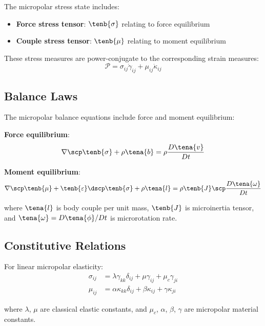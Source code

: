 The micropolar stress state includes:
\begin{itemize}
\item \textbf{Force stress tensor}: $\tenb{\sigma}$ relating to force equilibrium
\item \textbf{Couple stress tensor}: $\tenb{\mu}$ relating to moment equilibrium
\end{itemize}

These stress measures are power-conjugate to the corresponding strain measures:
\begin{equation}
\mathcal{P} = \sigma_{ij} \dot{\gamma}_{ij} + \mu_{ij} \dot{\kappa}_{ij}
\end{equation}

\subsection{Balance Laws}

The micropolar balance equations include force and moment equilibrium:

\textbf{Force equilibrium}:
\begin{equation}
\nabla \scp \tenb{\sigma} + \rho \tena{b} = \rho \frac{D\tena{v}}{Dt}
\end{equation}

\textbf{Moment equilibrium}:
\begin{equation}
\nabla \scp \tenb{\mu} + \tenb{\varepsilon} \dscp \tenb{\sigma} + \rho \tena{l} = \rho \tenb{J} \scp \frac{D\tena{\omega}}{Dt}
\end{equation}

where $\tena{l}$ is body couple per unit mass, $\tenb{J}$ is microinertia tensor, and $\tena{\omega} = D\tena{\phi}/Dt$ is microrotation rate.

\subsection{Constitutive Relations}

For linear micropolar elasticity:
\begin{align}
\sigma_{ij} &= \lambda \gamma_{kk} \delta_{ij} + \mu \gamma_{ij} + \mu_c \gamma_{ji}\\
\mu_{ij} &= \alpha \kappa_{kk} \delta_{ij} + \beta \kappa_{ij} + \gamma \kappa_{ji}
\end{align}

where $\lambda$, $\mu$ are classical elastic constants, and $\mu_c$, $\alpha$, $\beta$, $\gamma$ are micropolar material constants.

